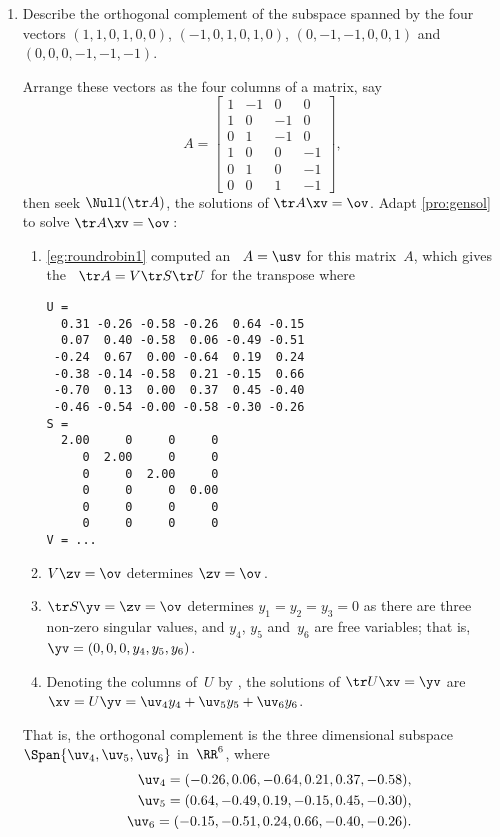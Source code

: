 \begin{example}
\begin{enumerate}
\item\label{eg:nulltrw:d} Describe the orthogonal complement of the subspace spanned by the four vectors \((1,1,0,1,0,0)\), \((-1,0,1,0,1,0)\), \((0,-1,-1,0,0,1)\) and \((0,0,0,-1,-1,-1)\).
\begin{solution} 
Arrange these vectors as the four columns of a matrix, say
\setbox\ajrqrbox\hbox{}%
\marginpar{\usebox{\ajrqrbox\\[2ex]}}%
\begin{equation*}
A=\begin{bmatrix}    1 & -1 & 0 & 0
\\ 1 & 0 & -1 & 0
\\ 0 & 1 & -1 & 0
\\ 1 & 0 & 0 & -1
\\ 0 & 1 & 0 & -1
\\ 0 & 0 & 1 & -1
 \end{bmatrix},
\end{equation*}
then seek \(\Null(\tr A)\), the solutions of \(\tr A\xv=\ov\).
Adapt \autoref{pro:gensol} to solve \(\tr A\xv=\ov\)\,:
\begin{enumerate}
\item \autoref{eg:roundrobin1} computed an \svd\ \(A=\usv\) for this matrix~\(A\), which gives the \svd\ \(\tr A=V\tr S\tr U\) for the transpose where \twodp
\begin{verbatim}
U =
  0.31 -0.26 -0.58 -0.26  0.64 -0.15
  0.07  0.40 -0.58  0.06 -0.49 -0.51
 -0.24  0.67  0.00 -0.64  0.19  0.24
 -0.38 -0.14 -0.58  0.21 -0.15  0.66
 -0.70  0.13  0.00  0.37  0.45 -0.40
 -0.46 -0.54 -0.00 -0.58 -0.30 -0.26
S =
  2.00     0     0     0
     0  2.00     0     0
     0     0  2.00     0
     0     0     0  0.00
     0     0     0     0
     0     0     0     0
V = ...
\end{verbatim}

\item \(V\zv=\ov\) determines \(\zv=\ov\)\,.
\item \(\tr S\yv=\zv=\ov\) determines \(y_1=y_2=y_3=0\) as there are three non-zero singular values, and \(y_4\), \(y_5\) and~\(y_6\) are free variables; that is, \(\yv=(0,0,0,y_4,y_5,y_6)\).
\item Denoting the columns of~\(U\) by \hlist{}, the solutions of \(\tr U\xv=\yv\) are \(\xv=U\yv=\uv_4y_4+\uv_5y_5+\uv_6y_6\).
\end{enumerate}
That is, the orthogonal complement is the three dimensional subspace \(\Span\{\uv_4,\uv_5,\uv_6\}\) in~\(\RR^6\),  where \twodp\
\begin{eqnarray*}
&&\uv_4=(-0.26,0.06,-0.64,0.21,0.37,-0.58),
\\&&\uv_5=(0.64,-0.49,0.19,-0.15,0.45,-0.30), 
\\&&\uv_6=(-0.15,-0.51,0.24,0.66,-0.40,-0.26).
\end{eqnarray*}
\end{solution}

\end{enumerate}
\end{example}


